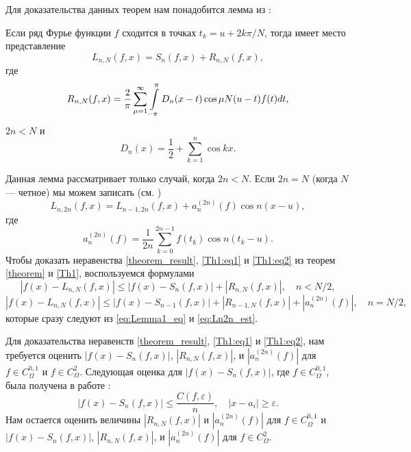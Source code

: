 Для доказательства данных теорем нам понадобится лемма из \cite{shii-1983}:
\begin{lemma} \label{shii_lemma}
	Если ряд Фурье функции $f$ сходится в точках $t_{k}=u+2k\pi/N$,
	тогда имеет место представление
	\begin{equation}
	L_{n,N}(f,x)=S_{n}(f,x)+R_{n,N}(f,x),\label{eq:Lemma1_eq}
	\end{equation}
	где
	\begin{equation}
	R_{n,N}(f,x)=\frac{2}{\pi}\sum_{\mu=1}^{\infty}\intop_{-\pi}^{\pi}D_{n}(x-t)\cos\mu N(u-t)f(t)dt,\label{eq:RnN1}
	\end{equation}
	$2n<N$ и
	\begin{equation}\label{eq:D(x)}
		D_{n}(x)=\frac{1}{2}+\sum_{k=1}^{n}\cos kx.
	\end{equation}
\end{lemma}
Данная лемма рассматривает только случай, когда $2n < N$. Если $2n=N$ (когда $N$ --- четное) мы можем записать (см. \cite{shii-1983})
\begin{equation}
	L_{n,2n}(f,x)=L_{n-1,2n}(f,x)+a_{n}^{(2n)}(f)\cos n(x-u),\label{eq:Ln2n_est}
\end{equation}
где
\begin{equation}
a_{n}^{(2n)}(f)=\frac{1}{2n}\sum_{k=0}^{2n-1}f(t_{k})\cos n(t_{k}-u).\label{eq:a_n_formula}
\end{equation}
Чтобы доказать неравенства \eqref{theorem_result}, \eqref{Th1:eq1} и \eqref{Th1:eq2} из теорем \ref{theorem} и \ref{Th1}, воспользуемся формулами
\begin{equation}
	\left|f(x)-L_{n,N}(f,x)\right|\leq\left|f(x)-S_{n}(f,x)\right|+\left|R_{n,N}(f,x)\right|,\quad n<N/2,\label{eq:Th_est1}
\end{equation}
\begin{equation}
	\left|f(x)-L_{n,N}(f,x)\right|\leq
	\left|f(x)-S_{n-1}(f,x)\right|+\left|R_{n-1,N}(f,x)\right|+\left|a_{n}^{(2n)}(f)\right|,\quad n=N/2\label{eq:Th_est_2},
\end{equation}
которые сразу следуют из \eqref{eq:Lemma1_eq} и \eqref{eq:Ln2n_est}.

Для доказательства неравенств \eqref{theorem_result}, \eqref{Th1:eq1} и \eqref{Th1:eq2}, нам требуется оценить $\left|f(x)-S_{n}(f,x)\right|$, $\left|R_{n,N}(f,x)\right|$, и $|a_{n}^{(2n)}(f)|$ для $f \in C^{0,1}_\Omega$ и $f \in C^2_\Omega$.
Следующая оценка для $|f(x)-S_{n}(f,x)|$, где $f \in C^{0,1}_\Omega$, была получена в работе \cite{mkasumov_disc_funcs}:
\begin{equation} \label{f_Sn_estimate_}
|f(x)-S_{n}(f,x)| \leq \frac{C(f,\varepsilon)}{n},\quad |x - a_i| \geq \varepsilon.
\end{equation}
Нам остается оценить величины
$|R_{n,N}(f,x)|$ и
$|a_{n}^{(2n)}(f)|$ для
$f \in C^{0,1}_\Omega$ и
$\left|f(x)-S_{n}(f,x)\right|$,
$\left|R_{n,N}(f,x)\right|$,
и
$|a_{n}^{(2n)}(f)|$
для
$f \in C^2_\Omega$.

